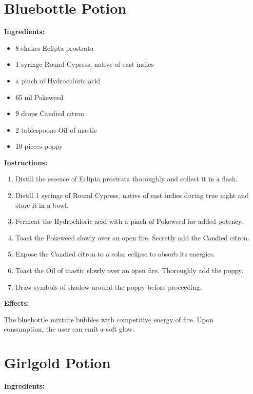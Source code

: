 \documentclass{article}
\begin{document}
\newpage
\section*{Bluebottle Potion}

\textbf{Ingredients:}

\begin{itemize}
  \item 8 shakes Eclipta prostrata
  \item 1 syringe Round Cypress, native of east indies
  \item a pinch of Hydrochloric acid
  \item 65 ml Pokeweed
  \item 9 drops Candied citron
  \item 2 tablespoons Oil of mastic
  \item 10 pieces poppy
\end{itemize}

\textbf{Instructions:}

\begin{enumerate}
  \item Distill the essence of Eclipta prostrata thoroughly and collect it in a flask.
  \item Distill 1 syringe of Round Cypress, native of east indies during true night and store it in a bowl.
  \item Ferment the Hydrochloric acid with a pinch of Pokeweed for added potency.
  \item Toast the Pokeweed slowly over an open fire. Secretly add the Candied citron.
  \item Expose the Candied citron to a solar eclipse to absorb its energies.
  \item Toast the Oil of mastic slowly over an open fire. Thoroughly add the poppy.
  \item Draw symbols of shadow around the poppy before proceeding.
\end{enumerate}

\textbf{Effects:}

The bluebottle mixture bubbles with competitive energy of fire. Upon consumption, the user can emit a soft glow.

\newpage
\section*{Girlgold Potion}

\textbf{Ingredients:}
\end{document}

